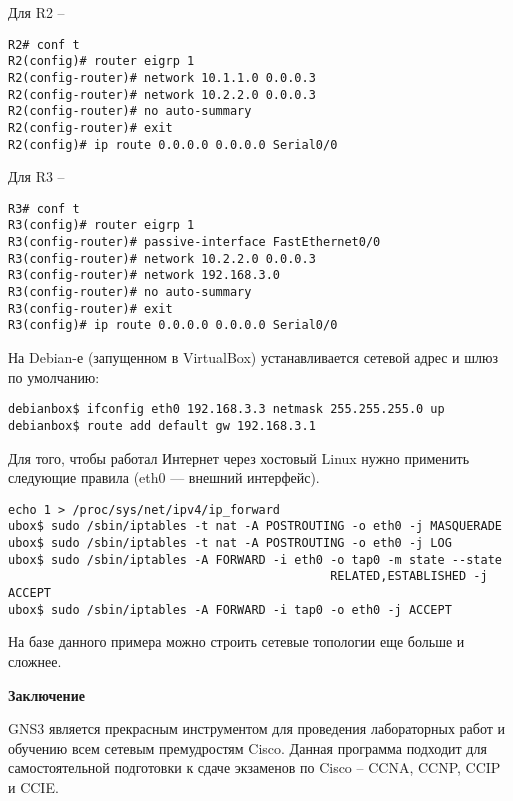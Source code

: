 \documentclass[a4paper, 12pt]{article}		%
\begin{document}
Для R2 --

\begin{Verbatim}[frame=single]
R2# conf t
R2(config)# router eigrp 1
R2(config-router)# network 10.1.1.0 0.0.0.3
R2(config-router)# network 10.2.2.0 0.0.0.3
R2(config-router)# no auto-summary
R2(config-router)# exit
R2(config)# ip route 0.0.0.0 0.0.0.0 Serial0/0
\end{Verbatim}

Для R3 --

\begin{Verbatim}[frame=single]
R3# conf t
R3(config)# router eigrp 1
R3(config-router)# passive-interface FastEthernet0/0
R3(config-router)# network 10.2.2.0 0.0.0.3
R3(config-router)# network 192.168.3.0
R3(config-router)# no auto-summary
R3(config-router)# exit
R3(config)# ip route 0.0.0.0 0.0.0.0 Serial0/0
\end{Verbatim}

На Debian-е (запущенном в VirtualBox) устанавливается сетевой адрес и шлюз по умолчанию:
\begin{Verbatim}[frame=single]
debianbox$ ifconfig eth0 192.168.3.3 netmask 255.255.255.0 up
debianbox$ route add default gw 192.168.3.1
\end{Verbatim}

Для того, чтобы работал Интернет через хостовый Linux нужно применить следующие правила (eth0 — внешний интерфейс).
\begin{Verbatim}[frame=single]
echo 1 > /proc/sys/net/ipv4/ip_forward
ubox$ sudo /sbin/iptables -t nat -A POSTROUTING -o eth0 -j MASQUERADE
ubox$ sudo /sbin/iptables -t nat -A POSTROUTING -o eth0 -j LOG
ubox$ sudo /sbin/iptables -A FORWARD -i eth0 -o tap0 -m state --state 
                                             RELATED,ESTABLISHED -j ACCEPT
ubox$ sudo /sbin/iptables -A FORWARD -i tap0 -o eth0 -j ACCEPT
\end{Verbatim}

На базе данного примера можно строить сетевые топологии еще больше и сложнее.

\textbf{Заключение}

GNS3 является прекрасным инструментом для проведения лабораторных работ и обучению всем сетевым премудростям Cisco. Данная программа подходит для самостоятельной подготовки к сдаче экзаменов по Cisco -- CCNA, CCNP, CCIP и CCIE.
\end{document}
